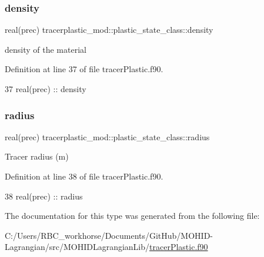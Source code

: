\subsubsection{\texorpdfstring{density}{density}}
{\footnotesize\ttfamily real(prec) tracerplastic\+\_\+mod\+::plastic\+\_\+state\+\_\+class\+::density\hspace{0.3cm}{\ttfamily [private]}}



density of the material 



Definition at line 37 of file tracer\+Plastic.\+f90.


\begin{DoxyCode}
37         \textcolor{keywordtype}{real(prec)} :: density
\end{DoxyCode}
\mbox{\label{structtracerplastic__mod_1_1plastic__state__class_adcabfc8dd732395f9721677448baf4c0}} 
\subsubsection{\texorpdfstring{radius}{radius}}
{\footnotesize\ttfamily real(prec) tracerplastic\+\_\+mod\+::plastic\+\_\+state\+\_\+class\+::radius\hspace{0.3cm}{\ttfamily [private]}}



Tracer radius (m) 



Definition at line 38 of file tracer\+Plastic.\+f90.


\begin{DoxyCode}
38         \textcolor{keywordtype}{real(prec)} :: radius
\end{DoxyCode}


The documentation for this type was generated from the following file\+:\begin{DoxyCompactItemize}
\item 
C\+:/\+Users/\+R\+B\+C\+\_\+workhorse/\+Documents/\+Git\+Hub/\+M\+O\+H\+I\+D-\/\+Lagrangian/src/\+M\+O\+H\+I\+D\+Lagrangian\+Lib/\mbox{\hyperlink{tracer_plastic_8f90}{tracer\+Plastic.\+f90}}\end{DoxyCompactItemize}
